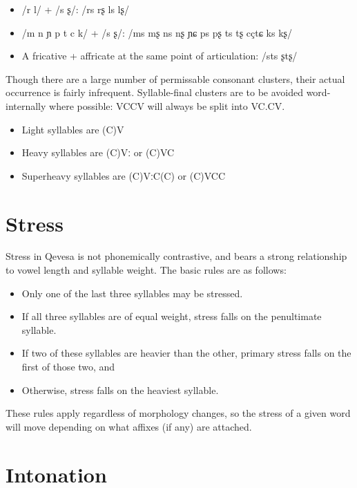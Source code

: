 \documentclass[grammar]{subfiles}
\begin{document}
\begin{itemize}
  \item /r l/ + /s ʂ/: /rs rʂ ls lʂ/
  \item /m n ɲ p t c k/ + /s ʂ/: /ms mʂ ns nʂ ɲɕ ps pʂ ts tʂ cç\tlde tɕ ks kʂ/
  \item A fricative + affricate at the same point of articulation: /sts ʂtʂ/
\end{itemize}

Though there are a large number of permissable consonant clusters, their actual
occurrence is fairly infrequent.  Syllable-final clusters are to be avoided
word-internally where possible: VCCV will always be split into VC.CV\@. 

\begin{itemize}
  \item Light syllables are (C)V
  \item Heavy syllables are (C)Vː or (C)VC
  \item Superheavy syllables are (C)VːC(C) or (C)VCC
\end{itemize}

\section{Stress}
\label{sec:stress}

Stress in Qevesa is not phonemically contrastive, and bears a strong
relationship to vowel length and syllable weight. The basic rules are as
follows: 

\begin{itemize}
  \item Only one of the last three syllables may be stressed.
  \item If all three syllables are of equal weight, stress falls on the penultimate syllable.
  \item If two of these syllables are heavier than the other, primary stress falls on the first of those two, and 
  \item Otherwise, stress falls on the heaviest syllable.
\end{itemize}

These rules apply regardless of morphology changes, so the stress of a given
word will move depending on what affixes (if any) are attached.

\section{Intonation}
\label{sec:intonation}
\end{document}

